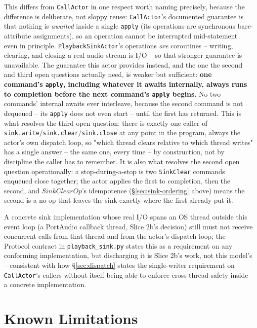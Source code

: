 \documentclass[a4paper,10pt,fleqn]{article}
\begin{document}
This differs from \texttt{CallActor} in one respect worth naming precisely,
because the difference is deliberate, not sloppy reuse: \texttt{CallActor}'s
documented guarantee is that nothing is \emph{awaited} inside a single
\texttt{apply} (its operations are synchronous bare-attribute assignments),
so an operation cannot be interrupted mid-statement even in principle.
\texttt{PlaybackSinkActor}'s operations \emph{are} coroutines --
writing, clearing, and closing a real audio stream is I/O -- so that
stronger guarantee is unavailable. The guarantee this actor provides
instead, and the one the second and third open questions actually need, is
weaker but sufficient: \textbf{one command's \texttt{apply}, including
whatever it awaits internally, always runs to completion before the next
command's \texttt{apply} begins.} No two commands' internal awaits ever
interleave, because the second command is not dequeued -- its \texttt{apply}
does not even start -- until the first has returned. This is what resolves
the third open question: there is exactly one caller of
\texttt{sink.write}/\texttt{sink.clear}/\texttt{sink.close} at any point in
the program, always the actor's own dispatch loop, so "which thread clears
relative to which thread writes" has a single answer -- the same one,
every time -- by construction, not by discipline the caller has to
remember. It is also what resolves the second open question operationally:
a stop-during-a-stop is two \texttt{SinkClear} commands enqueued close
together; the actor applies the first to completion, then the second, and
$SinkClearOp$'s idempotence (\S\ref{sec:sink-ordering} above) means the
second is a no-op that leaves the sink exactly where the first already put
it.

A concrete sink implementation whose real I/O spans an OS thread outside
this event loop (a PortAudio callback thread, Slice 2b's decision) still
must not receive concurrent calls from that thread and from the actor's
dispatch loop; the Protocol contract in
\texttt{playback\_sink.py} states this as a requirement on any conforming
implementation, but discharging it is Slice 2b's work, not this model's --
consistent with how \S\ref{sec:dispatch} states the single-writer
requirement on \texttt{CallActor}'s callers without itself being able to
enforce cross-thread safety inside a concrete implementation.

\section{Known Limitations}
\end{document}
